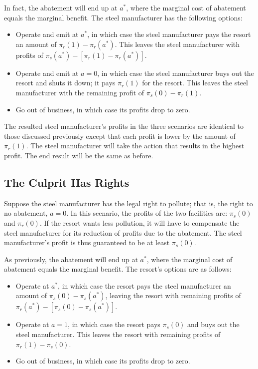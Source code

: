\documentclass[
]{book}
\providecommand{\tightlist}{%
  \setlength{\itemsep}{0pt}\setlength{\parskip}{0pt}}
\begin{document}
In fact, the abatement will end up at \(a^*\), where the marginal cost of abatement equals the marginal benefit. The steel manufacturer has the following options:

\begin{itemize}
\tightlist
\item
  Operate and emit at \(a^*\), in which case the steel manufacturer pays the resort an amount of \(\pi_r(1)-\pi_r(a^*)\). This leaves the steel manufacturer with profits of \(\pi_s(a^*)-[\pi_r(1)-\pi_r(a^*)]\).
\item
  Operate and emit at \(a=0\), in which case the steel manufacturer buys out the resort and shuts it down; it pays \(\pi_r(1)\) for the resort. This leaves the steel manufacturer with the remaining profit of \(\pi_s(0)-\pi_r(1)\).
\item
  Go out of business, in which case its profits drop to zero.
\end{itemize}

The resulted steel manufacturer's profits in the three scenarios are identical to those discussed previously except that each profit is lower by the amount of \(\pi_r(1)\). The steel manufacturer will take the action that results in the highest profit. The end result will be the same as before.

\hypertarget{the-culprit-has-rights}{%
\subsection{The Culprit Has Rights}\label{the-culprit-has-rights}}

Suppose the steel manufacturer has the legal right to pollute; that is, the right to no abatement, \(a=0\). In this scenario, the profits of the two facilities are: \(\pi_s(0)\) and \(\pi_r(0)\). If the resort wants less pollution, it will have to compensate the steel manufacturer for its reduction of profits due to the abatement. The steel manufacturer's profit is thus guaranteed to be at least \(\pi_s(0)\).

As previously, the abatement will end up at \(a^*\), where the marginal cost of abatement equals the marginal benefit. The resort's options are as follows:

\begin{itemize}
\tightlist
\item
  Operate at \(a^*\), in which case the resort pays the steel manufacturer an amount of \(\pi_s(0)-\pi_s(a^*)\), leaving the resort with remaining profits of \(\pi_r(a^*)-[\pi_s(0)-\pi_s(a^*)]\).
\item
  Operate at \(a=1\), in which case the resort pays \(\pi_s(0)\) and buys out the steel manufacturer. This leaves the resort with remaining profits of \(\pi_r(1)-\pi_s(0)\).
\item
  Go out of business, in which case its profits drop to zero.
\end{itemize}
\end{document}
